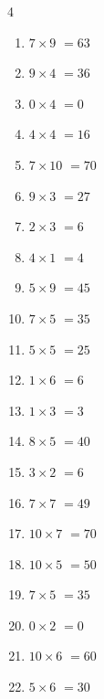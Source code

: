 \begin{multicols}{4}
\begin{enumerate}
  \item $7\times 9$
        $=63$

  \item $9\times 4$
        $=36$

  \item $0\times 4$
        $=0$

  \item $4\times 4$
        $=16$

  \item $7\times 10$
        $=70$

  \item $9\times 3$
        $=27$

  \item $2\times 3$
        $=6$

\columnbreak %

\resetques

  \item $4\times 1$
        $=4$

  \item $5\times 9$
        $=45$

  \item $7\times 5$
        $=35$

  \item $5\times 5$
        $=25$

  \item $1\times 6$
        $=6$

  \item $1\times 3$
        $=3$

  \item $8\times 5$
        $=40$

  \item $3\times 2$
        $=6$

  \item $7\times 7$
        $=49$

  \item $10\times 7$
        $=70$

  \item $10\times 5$
        $=50$

  \item $7\times 5$
        $=35$

  \item $0\times 2$
        $=0$

  \item $10\times 6$
        $=60$

  \item $5\times 6$
        $=30$


\end{enumerate}
\end{multicols}

